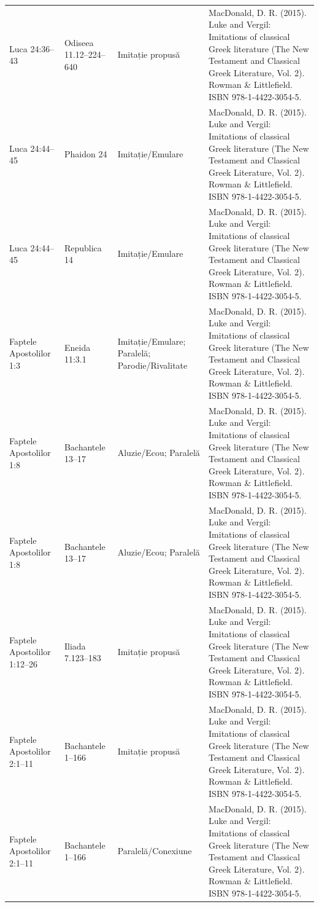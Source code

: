 \documentclass[12pt,a4paper,twoside,openany]{book}
\begin{document}
\begin{longtable}{L{1.4cm}L{1.7cm}L{3.1cm}L{8.4cm}}
Luca 24:36–43 & Odiseea 11.12–224–640 & Imitație propusă & MacDonald, D. R. (2015). Luke and Vergil: Imitations of classical Greek literature (The New Testament and Classical Greek Literature, Vol. 2). Rowman \& Littlefield. ISBN 978-1-4422-3054-5. \\
Luca 24:44–45 & Phaidon 24 & Imitație/Emulare & MacDonald, D. R. (2015). Luke and Vergil: Imitations of classical Greek literature (The New Testament and Classical Greek Literature, Vol. 2). Rowman \& Littlefield. ISBN 978-1-4422-3054-5. \\
Luca 24:44–45 & Republica 14 & Imitație/Emulare & MacDonald, D. R. (2015). Luke and Vergil: Imitations of classical Greek literature (The New Testament and Classical Greek Literature, Vol. 2). Rowman \& Littlefield. ISBN 978-1-4422-3054-5. \\
Faptele Apostolilor 1:3 & Eneida 11:3.1 & Imitație/Emulare; Paralelă; Parodie/Rivalitate & MacDonald, D. R. (2015). Luke and Vergil: Imitations of classical Greek literature (The New Testament and Classical Greek Literature, Vol. 2). Rowman \& Littlefield. ISBN 978-1-4422-3054-5. \\
Faptele Apostolilor 1:8 & Bachantele 13–17 & Aluzie/Ecou; Paralelă & MacDonald, D. R. (2015). Luke and Vergil: Imitations of classical Greek literature (The New Testament and Classical Greek Literature, Vol. 2). Rowman \& Littlefield. ISBN 978-1-4422-3054-5. \\
Faptele Apostolilor 1:8 & Bachantele 13–17 & Aluzie/Ecou; Paralelă & MacDonald, D. R. (2015). Luke and Vergil: Imitations of classical Greek literature (The New Testament and Classical Greek Literature, Vol. 2). Rowman \& Littlefield. ISBN 978-1-4422-3054-5. \\
Faptele Apostolilor 1:12–26 & Iliada 7.123–183 & Imitație propusă & MacDonald, D. R. (2015). Luke and Vergil: Imitations of classical Greek literature (The New Testament and Classical Greek Literature, Vol. 2). Rowman \& Littlefield. ISBN 978-1-4422-3054-5. \\
Faptele Apostolilor 2:1–11 & Bachantele 1–166 & Imitație propusă & MacDonald, D. R. (2015). Luke and Vergil: Imitations of classical Greek literature (The New Testament and Classical Greek Literature, Vol. 2). Rowman \& Littlefield. ISBN 978-1-4422-3054-5. \\
Faptele Apostolilor 2:1–11 & Bachantele 1–166 & Paralelă/Conexiune & MacDonald, D. R. (2015). Luke and Vergil: Imitations of classical Greek literature (The New Testament and Classical Greek Literature, Vol. 2). Rowman \& Littlefield. ISBN 978-1-4422-3054-5. \\

\end{longtable}
\end{document}
